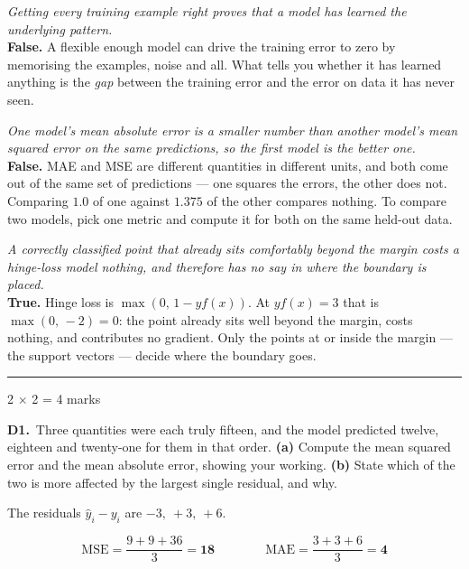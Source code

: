 \documentclass[10pt,a4paper]{article}
\newcommand{\parthead}[2]{\vspace{2pt}\noindent\rule{\linewidth}{0.4pt}\par\vspace{2pt}%
  \noindent{\bfseries Part #1}\hfill{\small #2}\par\vspace{1pt}}
\newcommand{\sol}[1]{\textbf{#1}}
\begin{document}
\begin{sC}

  \item \emph{Getting every training example right proves that a model has learned the underlying pattern.}\\[2pt] \textbf{False.} A flexible enough model can drive the training error to zero by memorising the examples, noise and all. What tells you whether it has learned anything is the \emph{gap} between the training error and the error on data it has never seen.

  \item \emph{One model's mean absolute error is a smaller number than another model's mean squared error on the same predictions, so the first model is the better one.}\\[2pt] \textbf{False.} MAE and MSE are different quantities in different units, and both come out of the same set of predictions --- one squares the errors, the other does not. Comparing $1.0$ of one against $1.375$ of the other compares nothing. To compare two models, pick one metric and compute it for both on the same held-out data.

  \item \emph{A correctly classified point that already sits comfortably beyond the margin costs a hinge-loss model nothing, and therefore has no say in where the boundary is placed.}\\[2pt] \textbf{True.} Hinge loss is $\max(0,\,1 - y f(x))$. At $y f(x) = 3$ that is $\max(0,\,-2) = 0$: the point already sits well beyond the margin, costs nothing, and contributes no gradient. Only the points at or inside the margin --- the support vectors --- decide where the boundary goes.

\end{sC}

\newpage

\parthead{D --- Short answer}{2 $\times$ 2 = 4 marks}

\textbf{D1.}\ Three quantities were each truly fifteen, and the model predicted twelve, eighteen and twenty-one for them in that order. \textbf{(a)} Compute the mean squared error and the mean absolute error, showing your working. \textbf{(b)} State which of the two is more affected by the largest single residual, and why.

\vspace{2pt}

The residuals $\hat y_i - y_i$ are $-3,\ +3,\ +6$.

\[ \mathrm{MSE} = \frac{9 + 9 + 36}{3} = \sol{18} \qquad\qquad \mathrm{MAE} = \frac{3 + 3 + 6}{3} = \sol{4} \]
\end{document}
